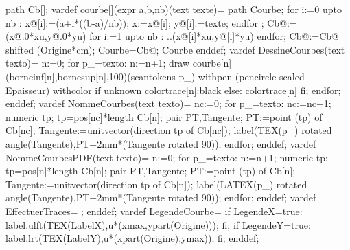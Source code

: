 {  path Cb[];
  vardef courbe[](expr a,b,nb)(text texte)=
  path Courbe;
  for i:=0 upto nb :
  x@[i]:=(a+i*((b-a)/nb));
  x:=x@[i];
  y@[i]:=texte;
  endfor ;
  Cb@:=(x@.0*xu,y@.0*yu)
  for i:=1 upto nb :
  ..(x@[i]*xu,y@[i]*yu)
  endfor;
  Cb@:=Cb@ shifted (Origine*cm);
  Courbe=Cb@;
  Courbe
  enddef;
  vardef DessineCourbes(text texto)=
  n:=0;
  for p_=texto:
  n:=n+1;
  draw courbe[n](borneinf[n],bornesup[n],100)(scantokens p_) withpen (pencircle scaled Epaisseur) withcolor if unknown colortrace[n]:black else: colortrace[n] fi;
  endfor;
  enddef;
  vardef NommeCourbes(text texto)=
  nc:=0;
  for p_=texto:
  nc:=nc+1;
  numeric tp;
  tp=pos[nc]*length Cb[n];
  pair PT,Tangente;
  PT:=point (tp) of Cb[nc];
  Tangente:=unitvector(direction tp of Cb[nc]);
  label(TEX(p_) rotated angle(Tangente),PT+2mm*(Tangente rotated 90));
  endfor;
  enddef;
  vardef NommeCourbesPDF(text texto)=
  n:=0;
  for p_=texto:
  n:=n+1;
  numeric tp;
  tp=pos[n]*length Cb[n];
  pair PT,Tangente;
  PT:=point (tp) of Cb[n];
  Tangente:=unitvector(direction tp of Cb[n]);
  label(LATEX(p_) rotated angle(Tangente),PT+2mm*(Tangente rotated 90));
  endfor;
  enddef;
  vardef EffectuerTraces=
  ;
  enddef;
  vardef LegendeCourbe=
  if LegendeX=true:
  label.ulft(TEX(LabelX),u*(xmax,ypart(Origine)));
  fi;
  if LegendeY=true:
    label.lrt(TEX(LabelY),u*(xpart(Origine),ymax));
  fi;
  enddef;
}%

